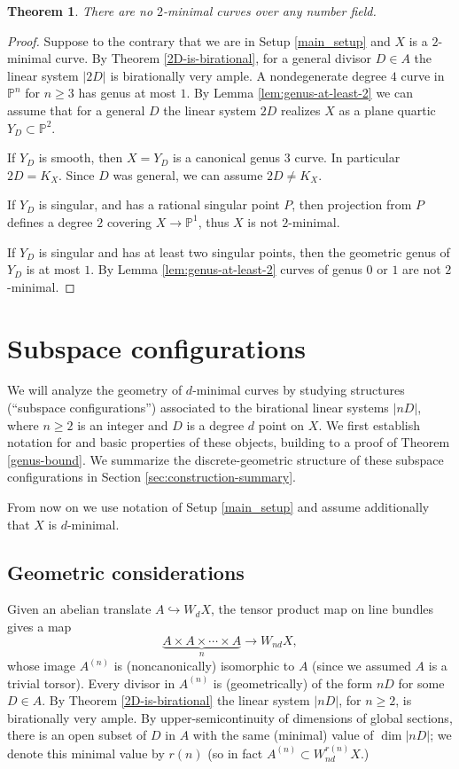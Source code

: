 \documentclass[11pt]{amsart}
\newcommand{\PP}{\mathbb{P}}
\newcommand{\pp}{\mathbb{P}}
\newtheorem{theorem}{Theorem}[section]
\theoremstyle{definition}
\theoremstyle{remark}
\begin{document}
\begin{theorem}\label{thm:no_2_min}
There are no $2$-minimal curves over any number field.
\end{theorem}
\begin{proof}
Suppose to the contrary that we are in Setup \ref{main_setup} and $X$ is a $2$-minimal curve. By Theorem \ref{2D-is-birational}, for a general divisor $D \in A$ the linear system $|2D|$ is birationally very ample. A nondegenerate degree $4$ curve in $\pp^n$ for $n \geqslant 3$ has genus at most $1$. By Lemma \ref{lem:genus-at-least-2} we can assume that for a general $D$ the linear system $2D$ realizes $X$ as a plane quartic $Y_D \subset \PP^2$.

If $Y_D$ is smooth, then $X=Y_D$ is a canonical genus $3$ curve. In particular $2D=K_X$. Since $D$ was general, we can assume $2D \neq K_X$.

If $Y_D$ is singular, and has a rational singular point $P$, then projection from $P$ defines a degree $2$ covering $X \to \PP^1$, thus $X$ is not $2$-minimal.

If $Y_D$ is singular and has at least two singular points, then the geometric genus of $Y_D$ is at most $1$. By Lemma \ref{lem:genus-at-least-2} curves of genus $0$ or $1$ are not $2$-minimal. 
\end{proof}
\section{Subspace configurations}\label{sec:subspace-configurations}

We will analyze the geometry of $d$-minimal curves by studying structures (``subspace configurations'') associated to the birational linear systems $|nD|$, where $n \geqslant 2$ is an integer and $D$ is a degree $d$ point on $X$. We first establish notation for and basic properties of these objects, building to a proof of Theorem \ref{genus-bound}. We summarize the discrete-geometric structure of these subspace configurations in Section \ref{sec:construction-summary}.

From now on we use notation of Setup \ref{main_setup} and assume additionally that $X$ is $d$-minimal.

\subsection{Geometric considerations}


Given an abelian translate $A \hookrightarrow W_dX$, the tensor product map on line bundles gives a map
\[\underbrace{A \times A \times \cdots \times A}_{n} \to W_{nd}X, \]
whose image $A^{(n)}$ is (noncanonically) isomorphic to $A$ (since we assumed $A$ is a trivial torsor).  Every divisor in $A^{(n)}$ is (geometrically) of the form $nD$ for some $D \in A$.  By Theorem \ref{2D-is-birational} the linear system $|nD|$, for $n \geqslant 2$, is birationally very ample.  By upper-semicontinuity of dimensions of global sections, there is an open subset of $D$ in $A$ with the same (minimal) value of $\dim |nD|$; we denote this minimal value by $r(n)$ (so in fact $A^{(n)} \subset W^{r(n)}_{nd}X$.)
\end{document}
